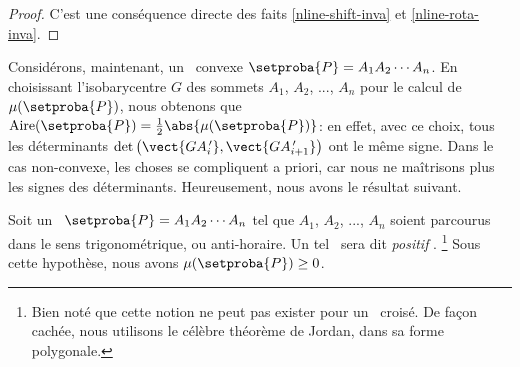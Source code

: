 \begin{proof}
    C'est une conséquence directe des faits \ref{nline-shift-inva} et \ref{nline-rota-inva}.
\end{proof}



Considérons, maintenant, un \ngone\ convexe $\setproba{P} = A_1 A_2 \cdots A_n$. En choisissant l'isobarycentre $G$ des sommets $A_1$, $A_2$, ..., $A_n$ pour le calcul de $\mu(\setproba{P})$, nous obtenons que $\area{\setproba{P}} = \frac12  \abs{\mu(\setproba{P})}$:
en effet,
avec ce choix, tous les déterminants $\det \big( \vect{G A^{\,\prime}_i} , \vect{G A^{\,\prime}_{i+1}} \big)$ ont le même signe.
Dans le cas non-convexe, les choses se compliquent a priori, car nous ne maîtrisons plus les signes des déterminants. Heureusement, nous avons le résultat suivant.


\begin{fact} \label{route-direction}
    Soit un \ngone\ $\setproba{P} = A_1 A_2 \cdots A_n$ tel que $A_1$, $A_2$, ..., $A_n$ soient parcourus dans le sens trigonométrique, ou anti-horaire.
    Un tel \ngone\ sera dit \og \emph{positif} \fg.%
    \footnote{
    	Bien noté que cette notion ne peut pas exister pour un \ngone\ croisé. De façon cachée, nous utilisons le célèbre théorème de Jordan, dans sa forme polygonale.
    }
    Sous cette hypothèse, nous avons $\mu(\setproba{P}) \geq 0$.
\end{fact}


